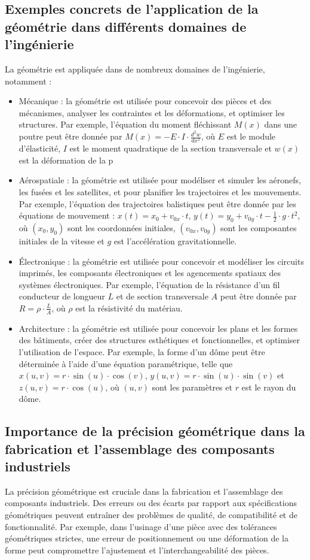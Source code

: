 \documentclass{article}
\begin{document}
\subsection{Exemples concrets de l'application de la géométrie dans différents domaines de l'ingénierie}
La géométrie est appliquée dans de nombreux domaines de l'ingénierie, notamment :
\begin{itemize}
  \item Mécanique : la géométrie est utilisée pour concevoir des pièces et des mécanismes, analyser les contraintes et les déformations, et optimiser les structures. Par exemple, l'équation du moment fléchissant $M(x)$ dans une poutre peut être donnée par $M(x) = -E \cdot I \cdot \frac{d^2w}{dx^2}$, où $E$ est le module d'élasticité, $I$ est le moment quadratique de la section transversale et $w(x)$ est la déformation de la p

  \item Aérospatiale : la géométrie est utilisée pour modéliser et simuler les aéronefs, les fusées et les satellites, et pour planifier les trajectoires et les mouvements. Par exemple, l'équation des trajectoires balistiques peut être donnée par les équations de mouvement : $x(t) = x_0 + v_{0x} \cdot t$, $y(t) = y_0 + v_{0y} \cdot t - \frac{1}{2} \cdot g \cdot t^2$, où $(x_0, y_0)$ sont les coordonnées initiales, $(v_{0x}, v_{0y})$ sont les composantes initiales de la vitesse et $g$ est l'accélération gravitationnelle.

  \item Électronique : la géométrie est utilisée pour concevoir et modéliser les circuits imprimés, les composants électroniques et les agencements spatiaux des systèmes électroniques. Par exemple, l'équation de la résistance d'un fil conducteur de longueur $L$ et de section transversale $A$ peut être donnée par $R = \rho \cdot \frac{L}{A}$, où $\rho$ est la résistivité du matériau.

  \item Architecture : la géométrie est utilisée pour concevoir les plans et les formes des bâtiments, créer des structures esthétiques et fonctionnelles, et optimiser l'utilisation de l'espace. Par exemple, la forme d'un dôme peut être déterminée à l'aide d'une équation paramétrique, telle que $x(u,v) = r \cdot \sin(u) \cdot \cos(v)$, $y(u,v) = r \cdot \sin(u) \cdot \sin(v)$ et $z(u,v) = r \cdot \cos(u)$, où $(u,v)$ sont les paramètres et $r$ est le rayon du dôme.
\end{itemize}

\subsection{Importance de la précision géométrique dans la fabrication et l'assemblage des composants industriels}
La précision géométrique est cruciale dans la fabrication et l'assemblage des composants industriels. Des erreurs ou des écarts par rapport aux spécifications géométriques peuvent entraîner des problèmes de qualité, de compatibilité et de fonctionnalité. Par exemple, dans l'usinage d'une pièce avec des tolérances géométriques strictes, une erreur de positionnement ou une déformation de la forme peut compromettre l'ajustement et l'interchangeabilité des pièces.
\end{document}
